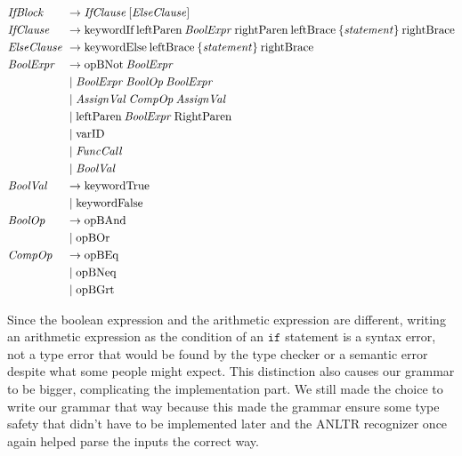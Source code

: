 \begin{align*}
    \omit $\mathit{IfBlock}$ \hfil &\rightarrow \mathit{IfClause} \: [\mathit{ElseClause}] \\
    \omit $\mathit{IfClause}$ \hfil &\rightarrow \text{keywordIf} \: \text{leftParen} \: \mathit{BoolExpr} \: \text{rightParen} \: \text{leftBrace} \: \{ \mathit{statement}\} \: \text{rightBrace} \\
    \omit $\mathit{ElseClause}$ \hfil &\rightarrow \text{keywordElse} \: \text{leftBrace} \: \{ \mathit{statement} \} \: \text{rightBrace} \\
    \omit $\mathit{BoolExpr}$ \hfil &\rightarrow \text{opBNot} \: \mathit{BoolExpr} \\
    & \mid \mathit{BoolExpr} \: \mathit{BoolOp} \: \mathit{BoolExpr} \\
    & \mid \mathit{AssignVal} \: \mathit{CompOp} \: \mathit{AssignVal} \\
    & \mid \text{leftParen} \: \mathit{BoolExpr} \: \text{RightParen} \\
    & \mid \text{varID} \\
    & \mid \mathit{FuncCall} \\
    & \mid \mathit{BoolVal} \\
    \omit $\mathit{BoolVal}$ \hfil & \rightarrow \text{keywordTrue} \\
    & \mid \text{keywordFalse} \\
    \omit $\mathit{BoolOp}$ \hfil &\rightarrow \text{opBAnd} \\
    & \mid \text{opBOr} \\
    \omit $\mathit{CompOp}$ \hfil & \rightarrow \text{opBEq} \\
    & \mid \text{opBNeq} \\
    & \mid \text{opBGrt}
\end{align*}

Since the boolean expression and the arithmetic expression are different, writing an arithmetic expression as the condition of an $\texttt{if}$ statement is a syntax error, not a type error that would be found by the type checker or a semantic error despite what some people might expect.
This distinction also causes our grammar to be bigger, complicating the implementation part.
We still made the choice to write our grammar that way because this made the grammar ensure some type safety that didn't have to be implemented later and the ANLTR recognizer once again helped parse the inputs the correct way.

